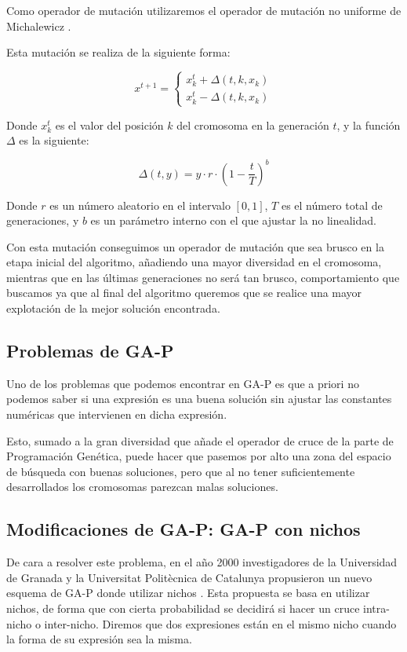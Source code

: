 Como operador de mutación utilizaremos el operador de mutación no uniforme de Michalewicz \cite{mutacionMichalewicz}.

Esta mutación se realiza de la siguiente forma:

\[ x^{t + 1} =
	\begin{cases}
		x_k^t + \Delta(t, k, x_k)\\
		x_k^t - \Delta(t, k, x_k)
	\end{cases}
\]

Donde $x_k^t$ es el valor del posición $k$ del cromosoma en la generación $t$, y la función $\Delta$ es la siguiente:

$$ \Delta(t, y) = y \cdot r \cdot (1 - \frac{t}{T})^b $$

Donde $r$ es un número aleatorio en el intervalo $[0, 1]$, $T$ es el número total de generaciones, y $b$ es un parámetro interno con el que ajustar la no linealidad.

Con esta mutación conseguimos un operador de mutación que sea brusco en la etapa inicial del algoritmo, añadiendo una mayor diversidad en el cromosoma, mientras que en las últimas generaciones no será tan brusco, comportamiento que buscamos ya que al final del algoritmo queremos que se realice una mayor explotación de la mejor solución encontrada.

\subsection{Problemas de GA-P}

Uno de los problemas que podemos encontrar en GA-P es que a priori no podemos saber si una expresión es una buena solución sin ajustar las constantes numéricas que intervienen en dicha expresión.

Esto, sumado a la gran diversidad que añade el operador de cruce de la parte de Programación Genética, puede hacer que pasemos por alto una zona del espacio de búsqueda con buenas soluciones, pero que al no tener suficientemente desarrollados los cromosomas parezcan malas soluciones.


\newpage

\subsection{Modificaciones de GA-P: GA-P con nichos}

De cara a resolver este problema, en el año 2000 investigadores de la Universidad de Granada y la Universitat Politècnica de Catalunya propusieron un nuevo esquema de GA-P donde utilizar nichos \cite{GAPnichos}. Esta propuesta se basa en utilizar nichos, de forma que con cierta probabilidad se decidirá si hacer un cruce intra-nicho o inter-nicho. Diremos que dos expresiones están en el mismo nicho cuando la forma de su expresión sea la misma.

